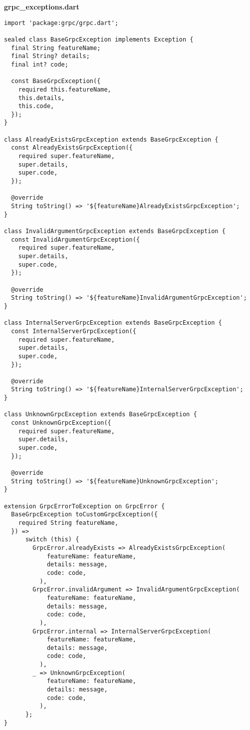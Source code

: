 \textbf{grpc\_exceptions.dart}
\begin{verbatim}
import 'package:grpc/grpc.dart';

sealed class BaseGrpcException implements Exception {
  final String featureName;
  final String? details;
  final int? code;

  const BaseGrpcException({
    required this.featureName,
    this.details,
    this.code,
  });
}

class AlreadyExistsGrpcException extends BaseGrpcException {
  const AlreadyExistsGrpcException({
    required super.featureName,
    super.details,
    super.code,
  });

  @override
  String toString() => '${featureName}AlreadyExistsGrpcException';
}

class InvalidArgumentGrpcException extends BaseGrpcException {
  const InvalidArgumentGrpcException({
    required super.featureName,
    super.details,
    super.code,
  });

  @override
  String toString() => '${featureName}InvalidArgumentGrpcException';
}

class InternalServerGrpcException extends BaseGrpcException {
  const InternalServerGrpcException({
    required super.featureName,
    super.details,
    super.code,
  });

  @override
  String toString() => '${featureName}InternalServerGrpcException';
}

class UnknownGrpcException extends BaseGrpcException {
  const UnknownGrpcException({
    required super.featureName,
    super.details,
    super.code,
  });

  @override
  String toString() => '${featureName}UnknownGrpcException';
}

extension GrpcErrorToException on GrpcError {
  BaseGrpcException toCustomGrpcException({
    required String featureName,
  }) =>
      switch (this) {
        GrpcError.alreadyExists => AlreadyExistsGrpcException(
            featureName: featureName,
            details: message,
            code: code,
          ),
        GrpcError.invalidArgument => InvalidArgumentGrpcException(
            featureName: featureName,
            details: message,
            code: code,
          ),
        GrpcError.internal => InternalServerGrpcException(
            featureName: featureName,
            details: message,
            code: code,
          ),
        _ => UnknownGrpcException(
            featureName: featureName,
            details: message,
            code: code,
          ),
      };
}
\end{verbatim}

